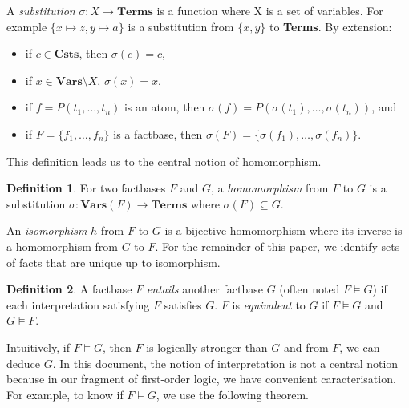 \documentclass{article}
\theoremstyle{definition}
\newtheorem{definition}{Definition}[section]
\theoremstyle{remark}
\newtheorem{remark}{Remark}[section]
\newcommand{\Vars}{\textbf{Vars}}
\newcommand{\Terms}{\textbf{Terms}}
\newcommand{\Csts}{\textbf{Csts}}
\begin{document}
 



A \emph{substitution} $\sigma:X \to \Terms$ is a function where X is a set of variables. For example $\{x \mapsto z, y \mapsto a \}$ is a substitution from $\{x,y\}$ to \Terms. By extension: 
\begin{itemize}
\item if $c \in \Csts$, then $\sigma(c) = c$,
\item if $x \in \Vars \setminus X$, $\sigma(x) = x$,
\item if $f = P(t_1,\ldots,t_n)$ is an atom, then $\sigma(f) = P(\sigma(t_1),\ldots,\sigma(t_n))$, and
\item if $F = \{f_1,\ldots,f_n\}$ is a factbase, then $\sigma(F) = \{\sigma(f_1),\ldots,\sigma(f_n)\}$.
\end{itemize}

This definition leads us to the central notion of homomorphism.

\begin{definition}
For two factbases $F$ and $G$, a \emph{homomorphism} from $F$ to $G$ is a substitution $\sigma:\Vars(F) \to \Terms$ where $\sigma(F) \subseteq G$. 
\end{definition}

An \emph{isomorphism} $h$ from $F$ to $G$ is a bijective homomorphism where its inverse is a homomorphism from $G$ to $F$. For the remainder of this paper, we identify sets of facts that are unique up to isomorphism. 

\begin{definition}
	A factbase $F$ \emph{entails} another factbase $G$ (often noted $F \vDash G$) if each interpretation satisfying $F$ satisfies $G$. $F$ is \emph{equivalent} to $G$ if $F \vDash G$ and $G \vDash F$.
\end{definition}
	
Intuitively, if $F \vDash G$, then $F$ is logically stronger than $G$ and from $F$, we can deduce $G$. In this document, the notion of interpretation is not a central notion because in our fragment of first-order logic, we have convenient caracterisation. For example, to know if $F \vDash G$, we use the following theorem.

\end{document}
